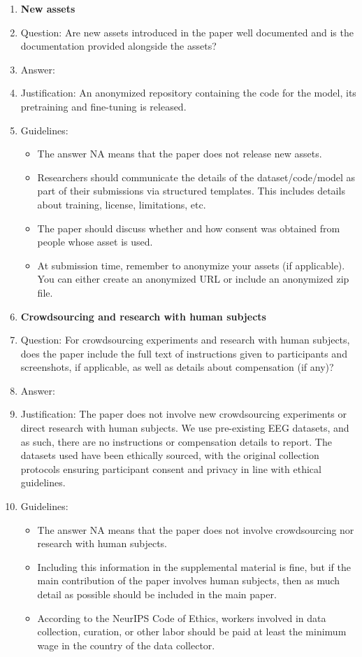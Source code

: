 \documentclass{article}
\begin{document}
\begin{enumerate}
\item {\bf New assets}
    \item[] Question: Are new assets introduced in the paper well documented and is the documentation provided alongside the assets?
    \item[] Answer: \answerYes{} %
    \item[] Justification: An anonymized repository containing the code for the model, its pretraining and fine-tuning is released.
    \item[] Guidelines:
    \begin{itemize}
        \item The answer NA means that the paper does not release new assets.
        \item Researchers should communicate the details of the dataset/code/model as part of their submissions via structured templates. This includes details about training, license, limitations, etc. 
        \item The paper should discuss whether and how consent was obtained from people whose asset is used.
        \item At submission time, remember to anonymize your assets (if applicable). You can either create an anonymized URL or include an anonymized zip file.
    \end{itemize}

\item {\bf Crowdsourcing and research with human subjects}
    \item[] Question: For crowdsourcing experiments and research with human subjects, does the paper include the full text of instructions given to participants and screenshots, if applicable, as well as details about compensation (if any)? 
    \item[] Answer: \answerNA{} %
    \item[] Justification: The paper does not involve new crowdsourcing experiments or direct research with human subjects. We use pre-existing EEG datasets, and as such, there are no instructions or compensation details to report. The datasets used have been ethically sourced, with the original collection protocols ensuring participant consent and privacy in line with ethical guidelines.
    \item[] Guidelines:
    \begin{itemize}
        \item The answer NA means that the paper does not involve crowdsourcing nor research with human subjects.
        \item Including this information in the supplemental material is fine, but if the main contribution of the paper involves human subjects, then as much detail as possible should be included in the main paper. 
        \item According to the NeurIPS Code of Ethics, workers involved in data collection, curation, or other labor should be paid at least the minimum wage in the country of the data collector. 
    \end{itemize}


\end{enumerate}
\end{document}
